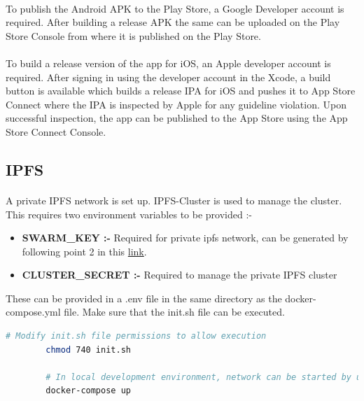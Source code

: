 \documentclass{article}
\begin{document}
        \paragraph{}
        To publish the Android APK to the Play Store, a Google Developer account is required. After building a release APK the same can be uploaded on the Play Store Console from where it is published on the Play Store.
        \paragraph{}
        To build a release version of the app for iOS, an Apple developer account is required. After signing in using the developer account in the Xcode, a build button is available which builds a release IPA for iOS and pushes it to App Store Connect where the IPA is inspected by Apple for any guideline violation. Upon successful inspection, the app can be published to the App Store using the App Store Connect Console.
    
    \subsection{IPFS}
        \paragraph{}
        A private IPFS network is set up. IPFS-Cluster is used to manage the cluster. This requires two environment variables to be provided :-
        \begin{itemize}
            \item \textbf{SWARM\_KEY :-} Required for private ipfs network, can be generated by following point 2 in this \href{https://github.com/ahester57/ipfs-private-swarm}{link}.
            \item \textbf{CLUSTER\_SECRET :-} Required to manage the private IPFS cluster
        \end{itemize}
    
        These can be provided in a .env file in the same directory as the docker-compose.yml file.
        Make sure that the init.sh file can be executed.
    
        \begin{lstlisting}[language=bash, caption=IPFS]
        # Modify init.sh file permissions to allow execution
        chmod 740 init.sh
        
        # In local development environment, network can be started by using the command:-
        docker-compose up
        \end{lstlisting}
    
\end{document}
